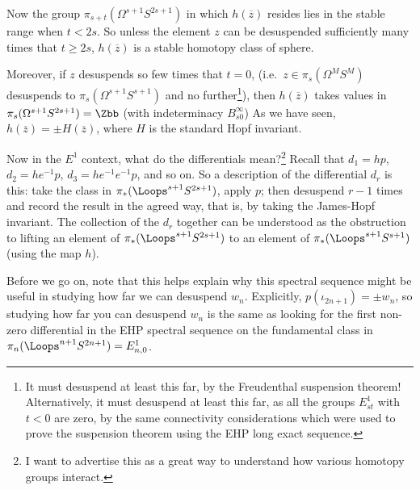 \begin{enumerate}
Now the group $\pi_{s+t}(\Omega^{s+1}S^{2s+1})$ in which $h(\overline z)$ resides lies in the stable range when $t<2s$. So unless the element $z$ can be desuspended sufficiently many times that $t\geq2s$, $h(\overline z)$ is a stable homotopy class of sphere.

Moreover, if $z$ desuspends so few times that $t=0$, (i.e.\ $z\in\pi_s(\Omega^M S^M)$ desuspends to $\pi_s(\Omega^{s+1} S^{s+1})$ and no further\footnote{It must desuspend at least this far, by the Freudenthal suspension theorem! Alternatively, it must desuspend at least this far, as all the groups $E_{st}^1$ with $t<0$ are zero, by the same connectivity considerations which were used to prove the suspension theorem using the EHP long exact sequence.}), then $h(\overline z)$ takes values in $\pi_{s}(\Omega^{s+1}S^{2s+1})=\Zbb$ (with indeterminacy $B_{s0}^\infty$) As we have seen, $h(\overline z)=\pm H(\overline z)$, where $H$ is the standard Hopf invariant.
\end{enumerate}



Now in the $E^1$ context, what do the differentials mean?\footnote{I want to advertise this as a great way to understand how various homotopy groups interact.}  Recall that $d_1 = hp$, $d_2 = he^{-1} p$, $d_3 = he^{-1} e^{-1} p$, and so on.  So a description of the differential $d_r$ is this: take the class in $\pi_* (\Loops^{s+1} S^{2s+1})$, apply $p$; then desuspend $r-1$ times and record the result in the agreed way, that is, by taking the James-Hopf invariant. The collection of the $d_r$ together can be understood as the obstruction to lifting an element of $\pi_*(\Loops^{s+1} S^{2s+1})$ to an element of $\pi_*(\Loops^{s+1} S^{s+1})$ (using the map $h$).

Before we go on, note that this helps explain why this spectral sequence might be useful in studying how far we can desuspend $w_n$. Explicitly, $p(\iota_{2n+1}) = \pm w_n$, so studying how far you can desuspend $w_n$ is the same as looking for the first non-zero differential in the EHP spectral sequence on the fundamental class in $\pi_n (\Loops^{n+1} S^{2n+1})=E^1_{n,0}$.

